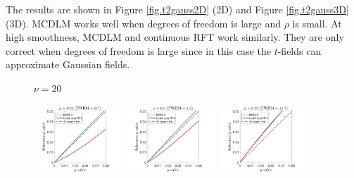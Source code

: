 \documentclass{article}
\begin{document}
The results are shown in Figure \ref{fig.t2gauss2D} (2D) and Figure \ref{fig.t2gauss3D} (3D). MCDLM works well when degrees of freedom is large and $\rho$ is small. At high smoothness, MCDLM and continuous RFT work similarly. They are only correct when degrees of freedom is large since in this case the $t$-fields can approximate Gaussian fields.

\begin{figure}[!htp]
\centering
\begin{sideways}
\phantom{------------------}$\nu = 20$
\end{sideways}
\includegraphics[trim=70 5 100 5, clip,width=0.3\textwidth]{figure/2D_nu20_rho0.01_gauss.jpg}
\includegraphics[trim=70 5 100 5, clip,width=0.3\textwidth]{figure/2D_nu20_rho0.5_gauss.jpg}
\includegraphics[trim=70 5 100 5, clip,width=0.3\textwidth]{figure/2D_nu20_rho0.99_gauss.jpg}


\end{figure}
\end{document}
